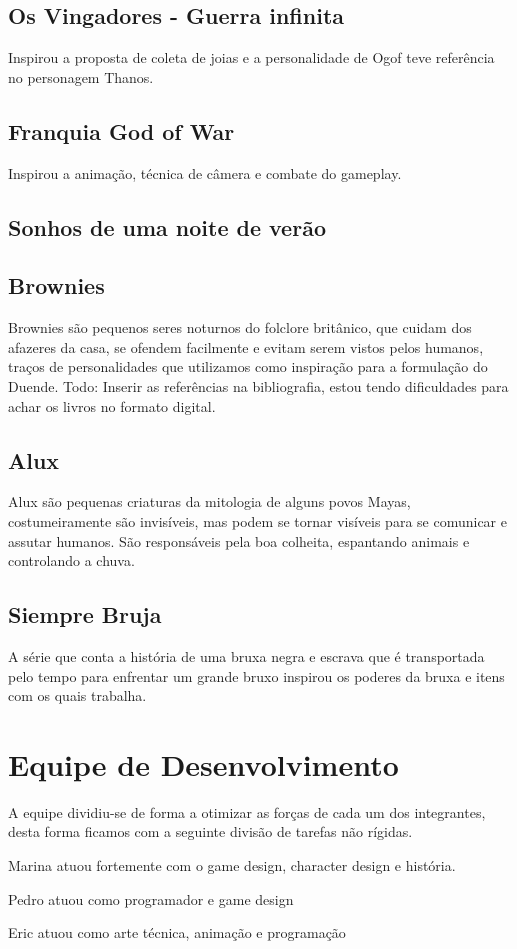\subsection{Os Vingadores - Guerra infinita}
Inspirou a proposta de coleta de joias e a personalidade de Ogof teve referência no personagem Thanos.
\subsection{Franquia God of War}
Inspirou a animação, técnica de câmera e combate do gameplay.
\subsection{Sonhos de uma noite de verão}
\subsection{Brownies}
Brownies são pequenos seres noturnos do folclore britânico, que cuidam dos afazeres da casa, se ofendem facilmente e evitam serem vistos pelos humanos, traços de personalidades que utilizamos como inspiração para a formulação do Duende.
Todo: Inserir as referências na bibliografia, estou tendo dificuldades para achar os livros no formato digital.

\subsection*{Alux}
Alux são pequenas criaturas da mitologia de alguns povos Mayas, costumeiramente são invisíveis, mas podem se tornar visíveis para se comunicar e assutar humanos.  São responsáveis pela boa colheita, espantando animais e controlando a chuva. 

\subsection*{Siempre Bruja}
A série que conta a história de uma bruxa negra e escrava que é transportada  pelo tempo para enfrentar um grande bruxo inspirou os poderes da bruxa e itens com os quais trabalha. 

\section{Equipe de Desenvolvimento}

A equipe dividiu-se de forma a otimizar as forças de cada um dos integrantes, desta forma ficamos com a seguinte divisão de tarefas não rígidas. 

Marina atuou fortemente com o game design, character design e história. 

Pedro atuou como programador e game design

Eric atuou como arte técnica, animação e programação